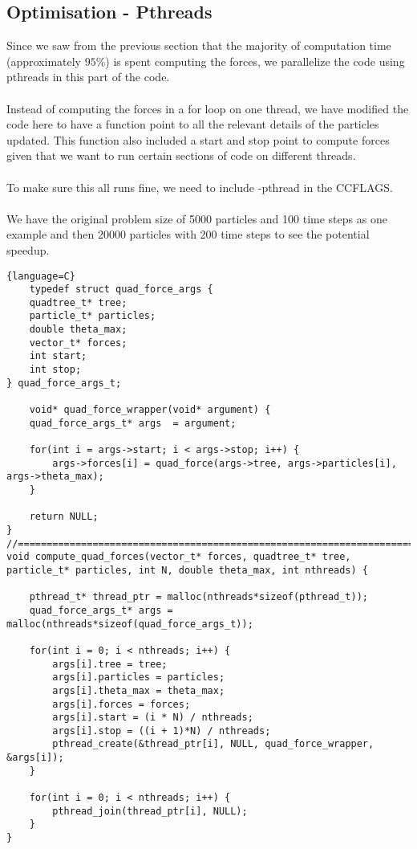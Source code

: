 \documentclass{article}
\begin{document}
\subsection{Optimisation - Pthreads}
Since we saw from the previous section that the majority of computation time (approximately $95\%$) is spent computing the forces, we parallelize the code using pthreads in this part of the code. 
\\\\
Instead of computing the forces in a for loop on one thread, we have modified the code here to have a function point to all the relevant details of the particles updated. This function also included a start and stop point to compute forces given that we want to run certain sections of code on different threads. 
\\\\
To make sure this all runs fine, we need to include -pthread in the CCFLAGS.
\\\\
We have the original problem size of 5000 particles and 100 time steps as one example and then 20000 particles with 200 time steps to see the potential speedup. 
\begin{lstlisting}{language=C}
    typedef struct quad_force_args {
    quadtree_t* tree;
    particle_t* particles;
    double theta_max;   
    vector_t* forces;
    int start;
    int stop;
} quad_force_args_t;

    void* quad_force_wrapper(void* argument) {
    quad_force_args_t* args  = argument;
    
    for(int i = args->start; i < args->stop; i++) {
        args->forces[i] = quad_force(args->tree, args->particles[i], args->theta_max);
    }

    return NULL;
}
//====================================================================================
void compute_quad_forces(vector_t* forces, quadtree_t* tree, particle_t* particles, int N, double theta_max, int nthreads) {

    pthread_t* thread_ptr = malloc(nthreads*sizeof(pthread_t));
    quad_force_args_t* args = malloc(nthreads*sizeof(quad_force_args_t));

    for(int i = 0; i < nthreads; i++) {
        args[i].tree = tree;
        args[i].particles = particles;
        args[i].theta_max = theta_max;
        args[i].forces = forces;
        args[i].start = (i * N) / nthreads;
        args[i].stop = ((i + 1)*N) / nthreads;
        pthread_create(&thread_ptr[i], NULL, quad_force_wrapper, &args[i]);
    }

    for(int i = 0; i < nthreads; i++) {
        pthread_join(thread_ptr[i], NULL);
    }
}
\end{lstlisting}
\end{document}

